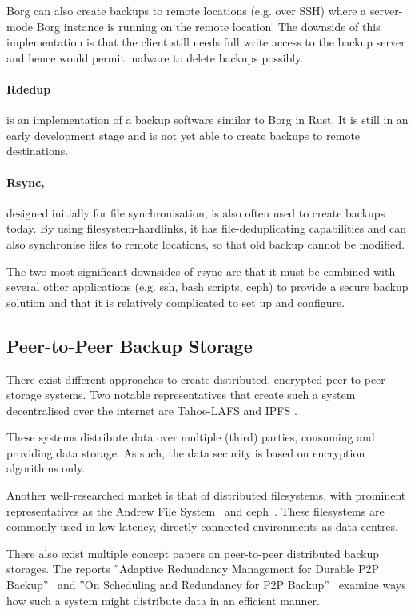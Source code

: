 Borg can also create backups to remote locations (e.g. over SSH) where a server-mode Borg instance is running on the remote location. The downside of this implementation is that the \gls{client} still needs full write access to the backup server and hence would permit malware to delete backups possibly.

\paragraph{Rdedup} \cite{rdedup} is an implementation of a backup software similar to Borg in Rust. It is still in an early development stage and is not yet able to create backups to remote destinations.

\paragraph{Rsync,} \cite{rsync} designed initially for file synchronisation, is also often used to create backups today. By using filesystem-hardlinks, it has file-deduplicating capabilities and can also synchronise files to remote locations, so that old backup cannot be modified.

The two most significant downsides of rsync are that it must be combined with several other applications (e.g. ssh, bash scripts, ceph) to provide a secure backup solution and that it is relatively complicated to set up and configure.



\subsection{Peer-to-Peer Backup Storage}

There exist different approaches to create distributed, encrypted peer-to-peer storage systems. Two notable representatives that create such a system decentralised over the internet are Tahoe-LAFS \cite{tahoe-lafs} and IPFS \cite{ipfs}.

These systems distribute data over multiple (third) parties, consuming and providing data storage. As such, the data security is based on encryption algorithms only.

Another well-researched market is that of distributed filesystems, with prominent representatives as the Andrew File System~\cite{afs} and ceph~\cite{ceph}. These filesystems are commonly used in low latency, directly connected environments as data centres.

There also exist multiple concept papers on peer-to-peer distributed backup storages. The reports ''Adaptive Redundancy Management for Durable P2P
Backup''~\cite{p2p-redundancy} and ''On Scheduling and Redundancy for P2P Backup''~\cite{p2p-scheduling} examine ways how such a system might distribute data in an efficient manner.

